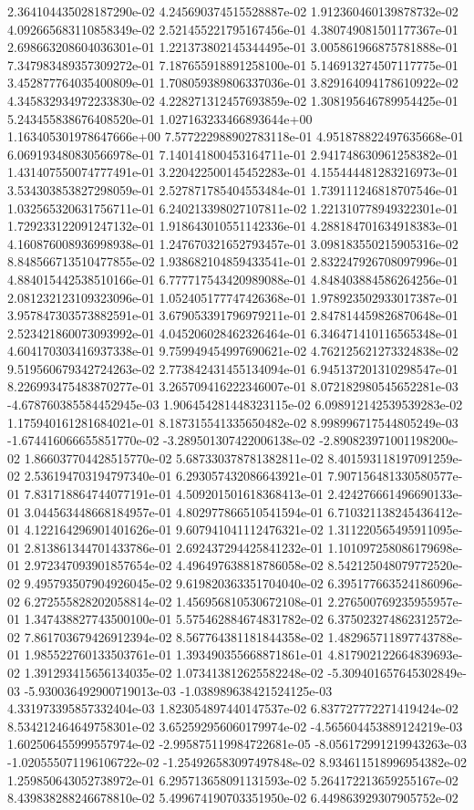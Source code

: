2.364104435028187290e-02	4.245690374515528887e-02	1.912360460139878732e-02	4.092665683110858349e-02	2.521455221795167456e-01	4.380749081501177367e-01	2.698663208604036301e-01	1.221373802145344495e-01	3.005861966875781888e-01	7.347983489357309272e-01	7.187655918891258100e-01	5.146913274507117775e-01	3.452877764035400809e-01	1.708059389806337036e-01	3.829164094178610922e-02	4.345832934972233830e-02	4.228271312457693859e-02	1.308195646789954425e-01	5.243455838676408520e-01	1.027163233466893644e+00	1.163405301978647666e+00	7.577222988902783118e-01	4.951878822497635668e-01	6.069193480830566978e-01	7.140141800453164711e-01	2.941748630961258382e-01	1.431407550074777491e-01	3.220422500145452283e-01	4.155444481283216973e-01	3.534303853827298059e-01	2.527871785404553484e-01	1.739111246818707546e-01	1.032565320631756711e-01	6.240213398027107811e-02	1.221310778949322301e-01	1.729233122091247132e-01	1.918643010551142336e-01	4.288184701634918383e-01	4.160876008936998938e-01	1.247670321652793457e-01	3.098183550215905316e-02	8.848566713510477855e-02	1.938682104859433541e-01	2.832247926708097996e-01	4.884015442538510166e-01	6.777717543420989088e-01	4.848403884586264256e-01	2.081232123109323096e-01	1.052405177747426368e-01	1.978923502933017387e-01	3.957847303573882591e-01	3.679053391796979211e-01	2.847814459826870648e-01	2.523421860073093992e-01	4.045206028462326464e-01	6.346471410116565348e-01	4.604170303416937338e-01	9.759949454997690621e-02	4.762125621273324838e-02	9.519560679342724263e-02	2.773842431455134094e-01	6.945137201310298547e-01	8.226993475483870277e-01	3.265709416222346007e-01	8.072182980545652281e-03	-4.678760385584452945e-03	1.906454281448323115e-02	6.098912142539539283e-02	1.175940161281684021e-01	8.187315541335650482e-02	8.998996717544805249e-03	-1.674416066655851770e-02	-3.289501307422006138e-02	-2.890823971001198200e-02	1.866037704428515770e-02	5.687330378781382811e-02	8.401593118197091259e-02	2.536194703194797340e-01	6.293057432086643921e-01	7.907156481330580577e-01	7.831718864744077191e-01	4.509201501618368413e-01	2.424276661496690133e-01	3.044563448668184957e-01	4.802977866510541594e-01	6.710321138245436412e-01	4.122164296901401626e-01	9.607941041112476321e-02	1.311220565495911095e-01	2.813861344701433786e-01	2.692437294425841232e-01	1.101097258086179698e-01	2.972347093901857654e-02	4.496497638818786058e-02	8.542125048079772520e-02	9.495793507904926045e-02	9.619820363351704040e-02	6.395177663524186096e-02	6.272555828202058814e-02	1.456956810530672108e-01	2.276500769235955957e-01	1.347438827743500100e-01	5.575462884674831782e-02	6.375023274862312572e-02	7.861703679426912394e-02	8.567764381181844358e-02	1.482965711897743788e-01	1.985522760133503761e-01	1.393490355668871861e-01	4.817902122664839693e-02	1.391293415656134035e-02	1.073413812625582248e-02	-5.309401657645302849e-03	-5.930036492900719013e-03	-1.038989638421524125e-03	4.331973395857332404e-03	1.823054897440147537e-02	6.837727772271419424e-02	8.534212464649758301e-02	3.652592956060179974e-02	-4.565604453889124219e-03	1.602506455999557974e-02	-2.995875119984722681e-05	-8.056172991219943263e-03	-1.020555071196106722e-02	-1.254926583097497848e-02	8.934611518996954382e-02	1.259850643052738972e-01	6.295713658091131593e-02	5.264172213659255167e-02	8.439838288246678810e-02	5.499674190703351950e-02	6.449863929307905752e-02
